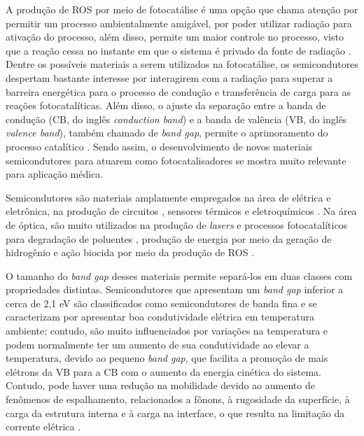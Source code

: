A produção de ROS por meio de fotocatálise é uma opção que chama atenção por permitir um processo ambientalmente amigável, por poder utilizar radiação para ativação do processo, além disso, permite um maior controle no processo, visto que a reação cessa no instante em que o sistema é privado da fonte de radiação \cite{he2025photocatalytic}. Dentre os possíveis materiais a serem utilizados na fotocatálise, os semicondutores despertam bastante interesse por interagirem com a radiação para superar a barreira energética para o processo de condução e transferência de carga para as reações fotocatalíticas. Além disso, o ajuste da separação entre a banda de condução (CB, do inglês \textit{conduction band}) e a banda de valência (VB, do inglês \textit{valence band}), também chamado de \textit{band gap}, permite o aprimoramento do processo catalítico \cite{wang2018design}. Sendo assim, o desenvolvimento de novos materiais semicondutores para atuarem como fotocatalisadores se mostra muito relevante para aplicação médica. 

Semicondutores são materiais amplamente empregados na área de elétrica e eletrônica, na produção de circuitos \cite{fan2023two}, sensores térmicos \cite{malits2017nanometric} e eletroquímicos \cite{cui2022electrochemical}. Na área de óptica, são muito utilizados na produção de \textit{lasers} \cite{ahn2023colloidal} e processos fotocatalíticos para degradação de poluentes \cite{zhong2024situ}, produção de energia por meio da geração de hidrogênio \cite{alfa2024recent} e ação biocida por meio da produção de ROS \cite{he2020multifunctional}.

O tamanho do \textit{band gap} desses materiais permite separá-los em duas classes com propriedades distintas. Semicondutores que apresentam um \textit{band gap} inferior a cerca de 2,1 eV são classificados como semicondutores de banda fina \cite{zhang2023recent} e se caracterizam por apresentar boa condutividade elétrica em temperatura ambiente; contudo, são muito influenciados por variações na temperatura e podem normalmente ter um aumento de sua condutividade ao elevar a temperatura, devido ao pequeno \textit{band gap}, que facilita a promoção de mais elétrons da VB para a CB com o aumento da energia cinética do sistema. Contudo, pode haver uma redução na mobilidade devido ao aumento de fenômenos de espalhamento, relacionados a fônons, à rugosidade da superfície, à carga da estrutura interna e à carga na interface, o que resulta na limitação da corrente elétrica \cite{wolpert2011managing}.

